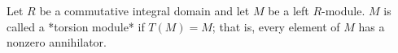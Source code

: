 Let $R$ be a commutative integral domain and let $M$ be a left $R$-module. $M$ is called a *torsion module* if $T(M) = M$; that is, every element of $M$ has a nonzero annihilator.
